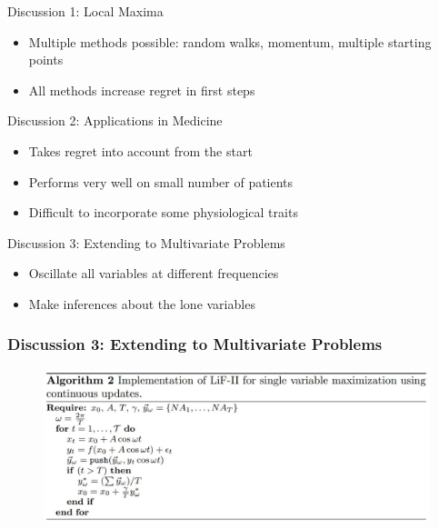 \documentclass{beamer}
\begin{document}
\begin{frame}{Discussion 1: Local Maxima}
    \begin{itemize}
        \item Multiple methods possible: random walks, momentum, multiple starting points
        \item All methods increase regret in first steps
    \end{itemize}
    
\end{frame}

\begin{frame}{Discussion 2: Applications in Medicine}
    \begin{itemize}
        \item Takes regret into account from the start
        \item Performs very well on small number of patients
        \item Difficult to incorporate some physiological traits
    \end{itemize}
    
\end{frame}

\begin{frame}{Discussion 3: Extending to Multivariate Problems}
    \begin{itemize}
        \item Oscillate all variables at different frequencies
        \item Make inferences about the lone variables
    \end{itemize}
\end{frame}

\begin{frame}
    \frametitle{Discussion 3: Extending to Multivariate Problems}
    
    \begin{figure}
            \centering
            \includegraphics[width=\textwidth]{images/algorithm}
            \label{fig:alg}
        \end{figure}
\end{frame}
\end{document}
